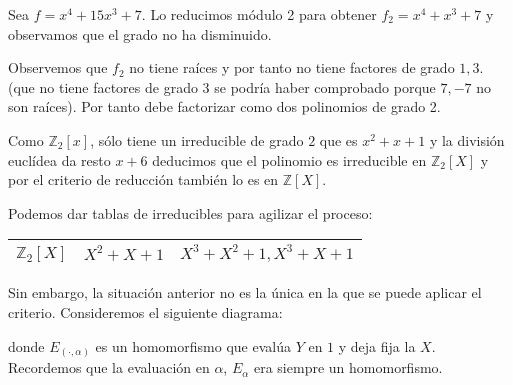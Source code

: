 \begin{example}
Sea $f = x^4+15x^3+7$. Lo reducimos módulo 2 para obtener $f_2 = x^4 + x^3 + 7$ y observamos que el grado no ha disminuido.

Observemos que $f_2$ no tiene raíces y por tanto no tiene factores de grado $1,3$.  (que no tiene factores de grado 3 se podría haber comprobado porque $7,-7$ no son raíces). Por tanto debe factorizar como dos polinomios de grado 2. 

Como $\mathbb{Z}_2[x]$, sólo tiene un irreducible de grado $2$ que es $x^2+x+1$ y la división euclídea da resto $x+6$ deducimos que el polinomio es irreducible en $\mathbb{Z}_2[X]$ y por el criterio de reducción también lo es en $\mathbb{Z}[X]$. 
\end{example}

Podemos dar tablas de irreducibles para agilizar el proceso:

\begin{center}
  \begin{tabular}{ l | c  | r }
    \hline
    $\mathbb{Z}_2[X]$ & $X^2+X+1$ & $X^3+X^2+1,X^3+X+1$  \\ 
    \hline
  \end{tabular}
\end{center}

Sin embargo, la situación anterior no es la única en la que se puede aplicar el criterio. Consideremos el siguiente diagrama:


donde $E_{(\cdot,\alpha)}$ es un homomorfismo que evalúa $Y$ en $1$ y deja fija la $X$. Recordemos que la evaluación en $\alpha$, $E_\alpha$ era siempre un homomorfismo. 


